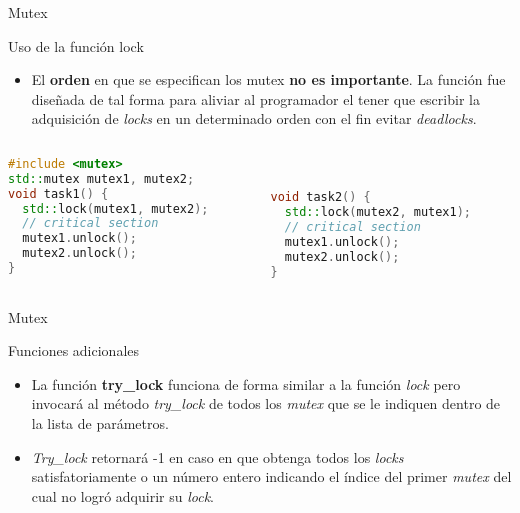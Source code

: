 \begin{frame}[fragile]{Mutex}
\begin{block}{Uso de la función lock}
\begin{itemize}
  \item El \textbf{orden} en que se especifican los mutex \textbf{no es importante}. La función fue diseñada de tal forma para aliviar al programador el tener que escribir la adquisición de \textit{locks} en un determinado orden con el fin evitar \textit{deadlocks}.
\end{itemize}
  \begin{columns}
  \begin{column}{.45\textwidth}
\begin{lstlisting}[language=C++, basicstyle=\small]
#include <mutex>
std::mutex mutex1, mutex2;
void task1() {
  std::lock(mutex1, mutex2);
  // critical section
  mutex1.unlock();
  mutex2.unlock();
}
\end{lstlisting}
  \end{column}
  \begin{column}{.45\textwidth}
\begin{lstlisting}[language=C++, basicstyle=\small]


void task2() {
  std::lock(mutex2, mutex1);
  // critical section
  mutex1.unlock();
  mutex2.unlock();
}
\end{lstlisting}
  \end{column}
  \end{columns}
\end{block}
\end{frame}

\begin{frame}{Mutex}
\begin{block}{Funciones adicionales}
\begin{itemize}
  \item La función \textbf{try\_lock} funciona de forma similar a la función \textit{lock} pero invocará al método \textit{try\_lock} de todos los \textit{mutex} que se le indiquen dentro de la lista de parámetros.
  \item \textit{Try\_lock} retornará -1 en caso en que obtenga todos los \textit{locks} satisfatoriamente o un número entero indicando el índice del primer \textit{mutex} del cual no logró adquirir su \textit{lock}.
\end{itemize}
\end{block}
\end{frame}

